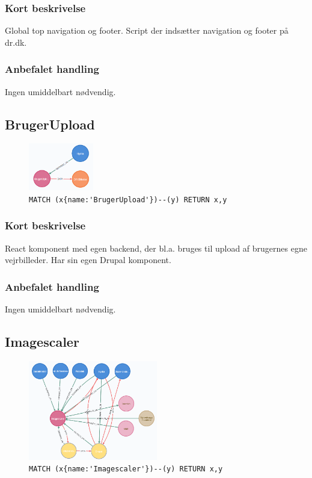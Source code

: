 \documentclass{article}
\begin{document}
\subsubsection*{Kort beskrivelse}
Global top navigation og footer.
Script der indsætter navigation og footer på dr.dk.
\subsubsection*{Anbefalet handling}
Ingen umiddelbart nødvendig.


\subsection{BrugerUpload}
\begin{figure}[H]
\includegraphics[width=80pt]{BrugerUpload.PNG}
\cprotect\caption{\verb|MATCH (x{name:'BrugerUpload'})--(y) RETURN x,y|}
\end{figure}
\subsubsection*{Kort beskrivelse}
React komponent med egen backend, der bl.a. bruges til upload af brugernes egne vejrbilleder. Har sin egen Drupal komponent.
\subsubsection*{Anbefalet handling}
Ingen umiddelbart nødvendig.


\subsection{Imagescaler}
\begin{figure}[H]
\includegraphics[width=160pt]{Imagescaler.PNG}
\cprotect\caption{\verb|MATCH (x{name:'Imagescaler'})--(y) RETURN x,y|}
\end{figure}
\end{document}
